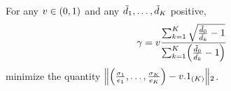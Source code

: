 


\begin{prop}\label{prop:demand:generation:gamma-choice}
For any $v\in\bracket{0,1}$ and any $\tilde{d}_1,\ldots,\tilde{d}_K$ positive,
\begin{equation}
  \gamma
  =
  v\frac
  {\sum_{k=1}^K\sqrt{\frac{\tilde{\demand}_0}{\bar{\demand_k}}-1}}
  {\sum_{k=1}^K\bracket{\frac{\tilde{\demand}_0}{\bar{\demand_k}}-1}}
\end{equation}
minimize the quantity
$\norm{\bracket{\frac{\sigma_1}{e_1},\ldots,\frac{\sigma_K}{e_K}}-v.1_{(K)}}_2$.
\end{prop}



